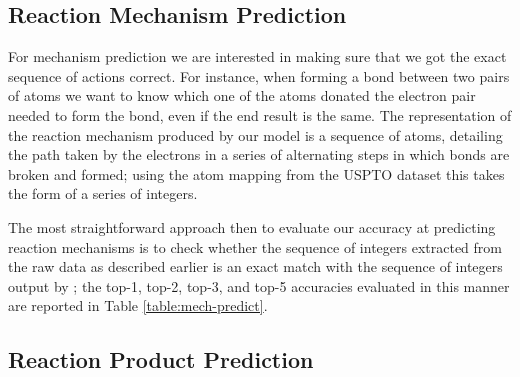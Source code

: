\subsection{Reaction Mechanism Prediction}

For mechanism prediction we are interested in making sure that we got the exact sequence of actions correct.
For instance, when forming a bond between two pairs of atoms we want to know which one of the atoms donated the electron pair needed to form the bond, even if the end result is the same. 
The representation of the reaction mechanism produced by our model is a sequence of atoms, detailing the path taken by the electrons in a series of alternating steps in which bonds are broken and formed; using the atom mapping from the USPTO dataset this takes the form of a series of integers.
%

The most straightforward approach then to evaluate our accuracy at predicting reaction mechanisms is to check whether the sequence of integers extracted from the raw data as described earlier
is an exact match with the sequence of integers output by \ourModel; the top-1, top-2, top-3, and top-5 accuracies evaluated in this manner are reported in Table \ref{table:mech-predict}.



\subsection{Reaction Product Prediction}
\label{sec:product-prediction}



